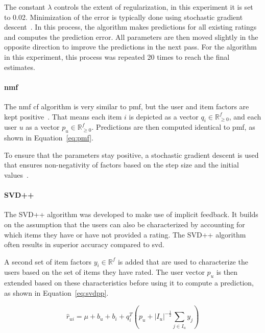 The constant $\lambda$ controls the extent of regularization, in this experiment it is set to 0.02. Minimization of the error is typically done using stochastic gradient descent~\cite{Hug2020, Ricci2010}.
In this process, the algorithm makes predictions for all existing ratings and computes the prediction error.
All parameters are then moved slightly in the opposite direction to improve the predictions in the next pass.
For the algorithm in this experiment, this process was repeated 20 times to reach the final estimates.

\paragraph{\gls{nmf}}
The \gls{nmf} \gls{cf} algorithm is very similar to \gls{pmf}, but the user and item factors are kept positive~\cite{NMF:2014, NMF_algo, zhang2006learning, Hug2020}.
That means each item $i$ is depicted as a vector $q_i \in \mathbb{R}_{\geq 0}^f$, and each user $u$ as a vector $p_u \in \mathbb{R}_{\geq 0}^f$.
Predictions are then computed identical to \gls{pmf}, as shown in Equation~\ref{eq:pmf}.

To ensure that the parameters stay positive, a stochastic gradient descent is used that ensures non-negativity of factors based on the step size and the initial values~\cite{Hug2020}.

\paragraph{SVD++}
The SVD++ algorithm was developed to make use of implicit feedback.
It builds on the assumption that the users can also be characterized by accounting for which items they have or have not provided a rating.
The SVD++ algorithm often results in superior accuracy compared to \gls{svd}.

A second set of item factors $y_i \in \mathbb{R}^f$ is added that are used to characterize the users based on the set of items they have rated.
The user vector $p_u$ is then extended based on these characteristics before using it to compute a prediction, as shown in Equation~\ref{eq:svdpp}. 

\begin{equation}
  \label{eq:svdpp}
    \hat{r}_{ui} = \mu + b_u + b_i + q_i^T\left(p_u +
        |I_u|^{-\frac{1}{2}} \sum_{j \in I_u}y_j\right)
\end{equation}

